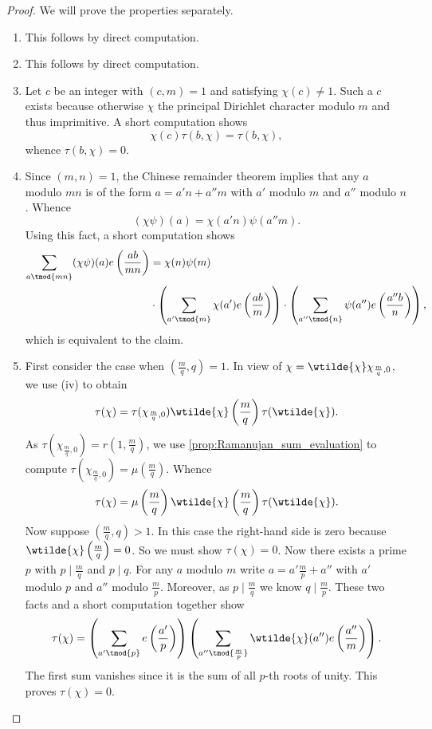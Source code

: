 \documentclass[12pt]{article}
\begin{document}
      \begin{proof}
        We will prove the properties separately.
        \begin{enumerate}[label*=(\roman*)]
          \item This follows by direct computation.
          \item This follows by direct computation.
          \item Let \(c\) be an integer with \((c,m) = 1\) and satisfying \(\chi(c) \neq 1\). Such a \(c\) exists because otherwise \(\chi\) the principal Dirichlet character modulo \(m\) and thus imprimitive. A short computation shows
          \[
            \chi(c)\tau(b,\chi) = \tau(b,\chi),
          \]
          whence \(\tau(b,\chi) = 0\).
          \item Since \((m,n) = 1\), the Chinese remainder theorem implies that any \(a\) modulo \(mn\) is of the form \(a = a'n+a''m\) with \(a'\) modulo \(m\) and \(a''\) modulo \(n\). Whence
          \[
            (\chi\psi)(a) = \chi(a'n)\psi(a''m).
          \]
          Using this fact, a short computation shows
          \begin{align*}
            \sum_{a \tmod{mn}}(\chi\psi)(a)e\left(\frac{ab}{mn}\right) &= \chi(n)\psi(m) \\
            &\cdot \left(\sum_{a' \tmod{m}}\chi(a')e\left(\frac{ab}{m}\right)\right)\cdot \left(\sum_{a'' \tmod{n}}\psi(a'')e\left(\frac{a''b}{n}\right)\right),
          \end{align*}
          which is equivalent to the claim.
          \item First consider the case when \(\left(\frac{m}{q},q\right) = 1\). In view of \(\chi = \wtilde{\chi}\chi_{\frac{m}{q},0}\), we use (iv) to obtain
          \[
            \tau(\chi) = \tau(\chi_{\frac{m}{q},0})\wtilde{\chi}\left(\frac{m}{q}\right)\tau(\wtilde{\chi}).
          \]
          As \(\tau(\chi_{\frac{m}{q},0}) = r\left(1,\frac{m}{q}\right)\), we use \cref{prop:Ramanujan_sum_evaluation} to compute \(\tau(\chi_{\frac{m}{q},0}) = \mu\left(\frac{m}{q}\right)\). Whence
          \[
            \tau(\chi) = \mu\left(\frac{m}{q}\right)\wtilde{\chi}\left(\frac{m}{q}\right)\tau(\wtilde{\chi}).
          \]
          Now suppose \(\left(\frac{m}{q},q\right) > 1\). In this case the right-hand side is zero because \(\wtilde{\chi}\left(\frac{m}{q}\right) = 0\). So we must show \(\tau(\chi) = 0\). Now there exists a prime \(p\) with \(p \mid \frac{m}{q}\) and \(p \mid q\). For any \(a\) modulo \(m\) write \(a = a'\frac{m}{p}+a''\) with \(a'\) modulo \(p\) and \(a''\) modulo \(\frac{m}{p}\). Moreover, as \(p \mid \frac{m}{q}\) we know \(q \mid \frac{m}{p}\). These two facts and a short computation together show
          \[
            \tau(\chi) = \left(\sum_{a' \tmod{p}}e\left(\frac{a'}{p}\right)\right)\left(\sum_{a'' \tmod{\frac{m}{p}}}\wtilde{\chi}(a'')e\left(\frac{a''}{m}\right)\right).
          \] 
          The first sum vanishes since it is the sum of all \(p\)-th roots of unity. This proves \(\tau(\chi) = 0\).
        \end{enumerate}
      \end{proof}
\end{document}
